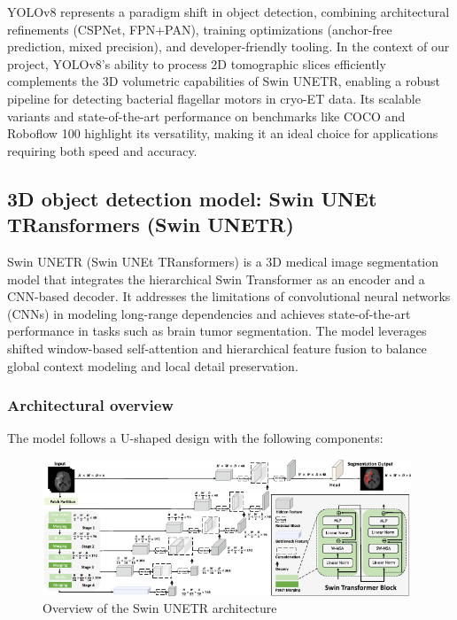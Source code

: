 \documentclass{article}
\begin{document}
YOLOv8 represents a paradigm shift in object detection, combining architectural refinements (CSPNet, FPN+PAN), training optimizations (anchor-free prediction, mixed precision), and developer-friendly tooling. In the context of our project, YOLOv8's ability to process 2D tomographic slices efficiently complements the 3D volumetric capabilities of Swin UNETR, enabling a robust pipeline for detecting bacterial flagellar motors in cryo-ET data. Its scalable variants and state-of-the-art performance on benchmarks like COCO and Roboflow 100 highlight its versatility, making it an ideal choice for applications requiring both speed and accuracy.

\subsection{3D object detection model: Swin UNEt TRansformers (Swin UNETR)}
Swin UNETR (Swin UNEt TRansformers)\cite{Hatamizadeh2022SwinUS} is a 3D medical image segmentation model that integrates the hierarchical Swin Transformer as an encoder and a CNN-based decoder. It addresses the limitations of convolutional neural networks (CNNs) in modeling long-range dependencies and achieves state-of-the-art performance in tasks such as brain tumor segmentation. The model leverages shifted window-based self-attention and hierarchical feature fusion to balance global context modeling and local detail preservation.

\subsubsection{Architectural overview}
The model follows a U-shaped design with the following components:

\begin{figure}[htb]
    \centering
    \includegraphics[width=0.98\textwidth]{images/Overview of the Swin UNETR architecture.pdf}
    \caption{Overview of the Swin UNETR architecture}
    \label{fig:Overview_of_the_Swin_UNETR_architecture}
\end{figure}
\end{document}
